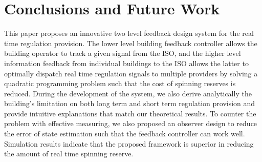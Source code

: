 \documentclass[journal]{IEEEtran}
\begin{document}
\section{Conclusions and Future Work}
\label{conclusion section}
This paper proposes an innovative two level feedback design system for the real time regulation provision. The lower level building feedback controller allows the building operator to track a given signal from the ISO, and the higher level information feedback from individual buildings to the ISO allows the latter to optimally dispatch real time regulation signals to multiple providers by solving a quadratic programming problem such that the cost of spinning reserves is reduced. During the development of the system, we also derive analytically the building's limitation on both long term and short term regulation provision and provide intuitive explanations that match our theoretical results. To counter the problem with effective measuring, we also proposed an observer design to reduce the error of state estimation such that the feedback controller can work well. Simulation results indicate that the proposed framework is superior in reducing the amount of real time spinning reserve.
\end{document}
